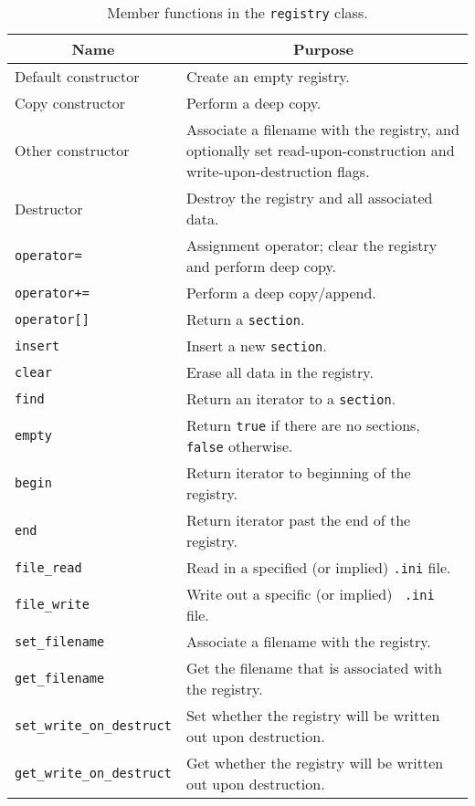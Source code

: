 \begin{table}[htbp]
  \begin{center}
    \leavevmode
    \begin{tabular}{|l|p{3in}|}
      \hline
      \multicolumn{1}{|c|}{Name} & \multicolumn{1}{c|}{Purpose} \\
      \hline
      Default constructor & Create an empty registry. \\
      Copy constructor & Perform a deep copy. \\
      Other constructor & Associate a filename with the registry, and
      optionally set read-upon-construction and write-upon-destruction
      flags. \\
      Destructor & Destroy the registry and all associated data. \\
      \hline
      {\tt operator=} & Assignment operator; clear the registry and
      perform deep copy.\\
      {\tt operator+=} & Perform a deep copy/append. \\
      {\tt operator[]} & Return a {\tt section}. \\
      {\tt insert} & Insert a new {\tt section}. \\
      {\tt clear} & Erase all data in the registry. \\
      {\tt find} & Return an iterator to a {\tt section}. \\
      {\tt empty} & Return {\tt true} if there are no sections, {\tt
        false} otherwise. \\
      {\tt begin} & Return iterator to beginning of the registry. \\
      {\tt end} & Return iterator past the end of the registry. \\
      {\tt file\_read} & Read in a specified (or implied) {\tt .ini}
      file. \\ 
      {\tt file\_write} & Write out a specific (or implied) {\tt
        .ini} file. \\
      {\tt set\_filename} & Associate a filename with the registry. \\
      {\tt get\_filename} & Get the filename that is associated with
      the registry. \\
      {\tt set\_write\_on\_destruct} & Set whether the registry will
      be written out upon destruction. \\
      {\tt get\_write\_on\_destruct} & Get whether the registry will
      be written out upon destruction. \\
      \hline
    \end{tabular}
    \caption{Member functions in the {\tt registry} class.}
    \label{tbl:registry-members}
  \end{center}
\end{table}

